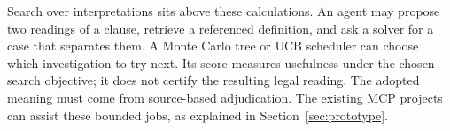 Search over interpretations sits above these calculations. An agent may propose
two readings of a clause, retrieve a referenced definition, and ask a solver for
a case that separates them. A Monte Carlo tree or UCB scheduler can choose which
investigation to try next. Its score measures usefulness under the chosen search
objective; it does not certify the resulting legal reading. The adopted meaning
must come from source-based adjudication. The existing MCP projects can assist
these bounded jobs, as explained in Section~\ref{sec:prototype}.
